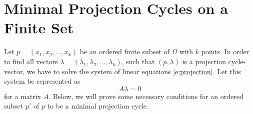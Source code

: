 \documentclass[12p]{article}
\numberwithin{equation}{section}
\begin{document}
\section{Minimal Projection Cycles on a Finite Set}
\vspace{15pt}

Let \(p=(x_1,x_2,...,x_k)\) be an ordered finite subset of \(\Omega\) with \(k\) points. In order to find all vectors \(\lambda=(\lambda_1,\lambda_2,\dots, \lambda_k)\), such that \((p,\lambda)\) is a projection cycle-vector, we have to solve the system of linear equations \eqref{e:projection}. Let this system be represented as 
\begin{equation} \label{e: matrix form}
    A\lambda=0
\end{equation}
for a matrix \(A\).
Below, we will prove some necessary conditions for an ordered subset \(p'\) of \(p\) to be a minimal projection cycle.
\end{document}
